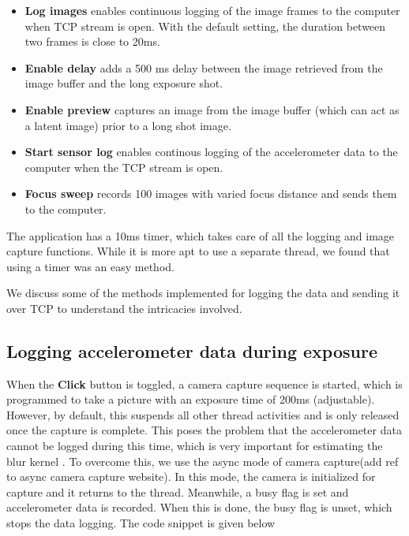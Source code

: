 \documentclass[BTech]{iitmdiss}
\begin{document}
\begin{itemize}
    \item \textbf{Log images} enables continuous logging of the image 
    frames to the computer when TCP stream is open. With the default
    setting, the duration between two frames is close to 20ms.
    \item \textbf{Enable delay} adds a 500 ms delay between the image
    retrieved from the image buffer and the long exposure shot.
    \item \textbf{Enable preview} captures an image from the image buffer
    (which can act as a latent image) prior to a long shot image. 
    \item \textbf{Start sensor log} enables continous logging of the 
    accelerometer data to the computer when the TCP stream is open. 
    \item \textbf{Focus sweep} records 100 images with varied focus 
    distance and sends them to the computer.
\end{itemize}

The application has a 10ms timer, which takes care of all the logging 
and image capture functions. While it is more apt to use a separate 
thread, we found that using a timer was an easy method. 

We discuss some of the methods implemented for logging the data and 
sending it over TCP to understand the intricacies involved.

\subsection{Logging accelerometer data during exposure}
\label{device:device_app:cam}
When the \textbf{Click} button is toggled, a camera capture sequence
is started, which is programmed to take a picture with an exposure time
of 200ms (adjustable). However, by default, this suspends all other 
thread activities and is only released once the capture is complete. 
This poses the problem that the accelerometer data cannot be logged 
during this time, which is very important for estimating the blur kernel
. To overcome this, we use the async mode of camera capture(add ref to
async camera capture website). In this mode, the camera is initialized
for capture and it returns to the thread. Meanwhile, a busy flag is set
and accelerometer data is recorded. When this is done, the busy flag is
unset, which stops the data logging. The code snippet is given below
\end{document}
